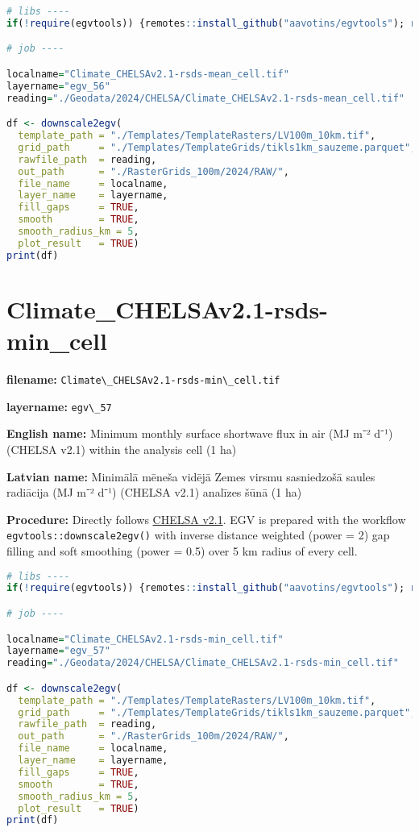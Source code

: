 \documentclass[
]{book}
\newcommand{\passthrough}[1]{#1}
\begin{document}
\begin{lstlisting}[language=R]
# libs ----
if(!require(egvtools)) {remotes::install_github("aavotins/egvtools"); require(egvtools)}

# job ----

localname="Climate_CHELSAv2.1-rsds-mean_cell.tif"
layername="egv_56"
reading="./Geodata/2024/CHELSA/Climate_CHELSAv2.1-rsds-mean_cell.tif"

df <- downscale2egv(
  template_path = "./Templates/TemplateRasters/LV100m_10km.tif",
  grid_path     = "./Templates/TemplateGrids/tikls1km_sauzeme.parquet",
  rawfile_path  = reading,
  out_path      = "./RasterGrids_100m/2024/RAW/",
  file_name     = localname,
  layer_name    = layername,
  fill_gaps     = TRUE,
  smooth        = TRUE,
  smooth_radius_km = 5,
  plot_result   = TRUE)
print(df)
\end{lstlisting}

\section{Climate\_CHELSAv2.1-rsds-min\_cell}\label{ch06.057}

\textbf{filename:} \passthrough{\lstinline!Climate\_CHELSAv2.1-rsds-min\_cell.tif!}

\textbf{layername:} \passthrough{\lstinline!egv\_57!}

\textbf{English name:} Minimum monthly surface shortwave flux in air (MJ m⁻² d⁻¹) (CHELSA v2.1) within the analysis cell (1 ha)

\textbf{Latvian name:} Minimālā mēneša vidējā Zemes virsmu sasniedzošā saules radiācija (MJ m⁻² d⁻¹) (CHELSA v2.1) analīzes šūnā (1 ha)

\textbf{Procedure:} Directly follows \hyperref[Ch04.11]{CHELSA v2.1}. EGV is prepared with the
workflow \passthrough{\lstinline!egvtools::downscale2egv()!} with inverse distance weighted (power = 2)
gap filling and soft smoothing (power = 0.5) over 5 km radius of every cell.

\begin{lstlisting}[language=R]
# libs ----
if(!require(egvtools)) {remotes::install_github("aavotins/egvtools"); require(egvtools)}

# job ----

localname="Climate_CHELSAv2.1-rsds-min_cell.tif"
layername="egv_57"
reading="./Geodata/2024/CHELSA/Climate_CHELSAv2.1-rsds-min_cell.tif"

df <- downscale2egv(
  template_path = "./Templates/TemplateRasters/LV100m_10km.tif",
  grid_path     = "./Templates/TemplateGrids/tikls1km_sauzeme.parquet",
  rawfile_path  = reading,
  out_path      = "./RasterGrids_100m/2024/RAW/",
  file_name     = localname,
  layer_name    = layername,
  fill_gaps     = TRUE,
  smooth        = TRUE,
  smooth_radius_km = 5,
  plot_result   = TRUE)
print(df)
\end{lstlisting}
\end{document}
